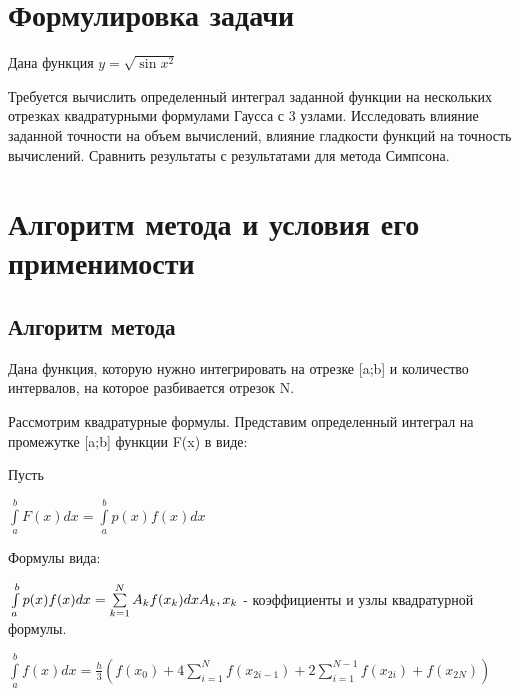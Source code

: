 






\section{Формулировка задачи}

Дана функция 
\begin{math} 
	y=\sqrt{\sin{x^{2}}}
\end{math}



Требуется вычислить определенный интеграл заданной функции на нескольких отрезках квадратурными формулами Гаусса с 3 узлами. Исследовать влияние заданной точности на объем вычислений, влияние гладкости функций на точность вычислений. Сравнить результаты с результатами для метода Симпсона.

\section{Алгоритм метода и условия его применимости}

\subsection{Алгоритм метода}

Дана функция, которую нужно интегрировать на отрезке [a;b] и количество интервалов, на которое разбивается отрезок N. 

Рассмотрим квадратурные формулы. Представим определенный интеграл на промежутке [a;b] функции F(x) в виде:


Пусть 

\begin{math} 
	\int\limits_{a}^{b}F(x)dx=\int\limits_{a}^{b}p(x)f(x)dx
\end{math}

Формулы вида:

\begin{math} 
	\\
	\int\limits_{a}^{b}p(x)f(x)dx=\sum\limits_{k=1}^{N}A_{k}f(x_{k})dx \\
	A_{k} , x_{k}
\end{math}
- коэффициенты и узлы квадратурной формулы. 



\begin{math} 
	\int\limits_{a}^{b}f(x)dx=\frac{h}{3}(f(x_{0})+4\sum\limits_{i=1}^{N}f(x_{2i-1})+2\sum\limits_{i=1}^{N-1}f(x_{2i})+f(x_{2N}))
\end{math}

